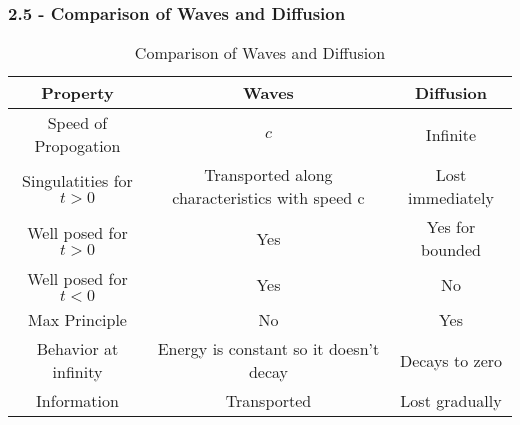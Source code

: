 \documentclass[answers,12pt,addpoints]{exam}
\begin{document}
\subsubsection{2.5 - Comparison of Waves and Diffusion}
\begin{table}[h!]
\centering
\begin{tabular}{|c|c|c|}
\hline
\textbf{Property} & \textbf{Waves} & \textbf{Diffusion} \\ \hline
Speed of Propogation & $c$ & Infinite \\ \hline
Singulatities for $t > 0$ & Transported along characteristics with speed c & Lost immediately \\ \hline
Well posed for $t > 0$ & Yes & Yes for bounded \\ \hline
Well posed for $t < 0$ & Yes & No \\ \hline
Max Principle & No & Yes \\ \hline
Behavior at infinity & Energy is constant so it doesn't decay & Decays to zero \\ \hline
Information & Transported & Lost gradually \\ \hline
\end{tabular}
\caption{Comparison of Waves and Diffusion}
\label{tab:comparison}
\end{table}
\end{document}

